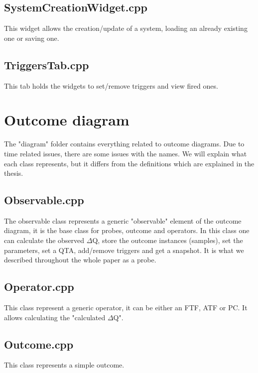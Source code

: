 \subsection{SystemCreationWidget.cpp} \label{code:syscw}
This widget allows the creation/update of a system, loading an already existing one or saving one.


\subsection{TriggersTab.cpp} \label{code:tt}
This tab holds the widgets to set/remove triggers and view fired ones. 


\section{Outcome diagram}

The "diagram" folder contains everything related to outcome diagrams. Due to time related issues, there are some issues with the names. We will explain what each class represents, but it differs from the definitions which are explained in the thesis.

\subsection{Observable.cpp} \label{code:obs}
The observable class represents a generic "observable" element of the outcome diagram, it is the base class for probes, outcome and operators. In this class one can calculate the observed $\Delta$Q, store the outcome instances (samples), set the parameters, set a QTA, add/remove triggers and get a snapshot. It is what we described throughout the whole paper as a probe.


\subsection{Operator.cpp} \label{code:op}
This class represent a generic operator, it can be either an FTF, ATF or PC. It allows calculating the "calculated $\Delta$Q".


\subsection{Outcome.cpp} \label{code:outc}
This class represents a simple outcome.


